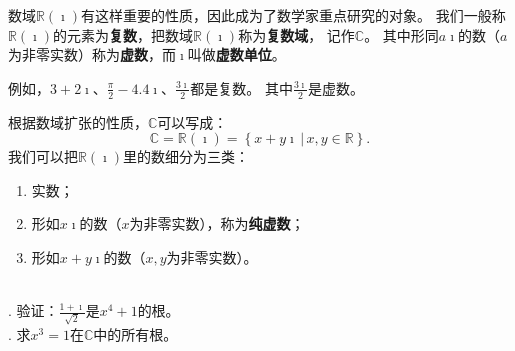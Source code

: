 \documentclass[12pt,UTF8,fontset=none]{ctexbook}
\begin{document}
数域$\mathbb{R}(\imath)$有这样重要的性质，因此成为了数学家重点研究的对象。
我们一般称$\mathbb{R}(\imath)$的元素为\textbf{复数}，把数域$\mathbb{R}(\imath)$称为\textbf{复数域}，
记作$\mathbb{C}$。
其中形同$a\imath$的数（$a$为非零实数）称为\textbf{虚数}，而$\imath$叫做\textbf{虚数单位}。

例如，$3 + 2\imath$、$\displaystyle\frac{\pi}{2} - 4.4\imath$、$\displaystyle\frac{3\imath}{2}$都是复数。
其中$\displaystyle\frac{3\imath}{2}$是虚数。

根据数域扩张的性质，$\mathbb{C}$可以写成：
$$\mathbb{C} = \mathbb{R}(\imath) = \left\{\left. x + y\imath \, \right| \, x, y \in \mathbb{R} \right\}. $$
我们可以把$\mathbb{R}(\imath)$里的数细分为三类：
\begin{enumerate}
    \item 实数；
    \item 形如$x\imath$的数（$x$为非零实数），称为\textbf{纯虚数}；
    \item 形如$x + y\imath$的数（$x, y$为非零实数）。
\end{enumerate}

\begin{et}
    \mbox{} \\
    . 验证：$\displaystyle\frac{1 + \imath}{\sqrt{2}}$是$x^4 + 1$的根。\\
    . 求$x^3 = 1$在$\mathbb{C}$中的所有根。
    
\end{et}
\end{document}
